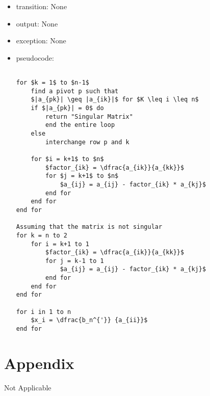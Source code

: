 \documentclass[12pt, titlepage]{article}
\begin{document}
\noindent %
\begin{itemize}
\item transition: None%
\item output: None%
\item exception: None%
\item pseudocode:
\begin{lstlisting}[mathescape=true]

for $k = 1$ to $n-1$
    find a pivot p such that
    $|a_{pk}| \geq |a_{ik}|$ for $K \leq i \leq n$
    if $|a_{pk}| = 0$ do
        return "Singular Matrix"
        end the entire loop
    else 
        interchange row p and k
        
    for $i = k+1$ to $n$
        $factor_{ik} = \dfrac{a_{ik}}{a_{kk}}$
        for $j = k+1$ to $n$
            $a_{ij} = a_{ij} - factor_{ik} * a_{kj}$
        end for
    end for
end for

Assuming that the matrix is not singular
for k = n to 2
    for i = k+1 to 1
        $factor_{ik} = \dfrac{a_{ik}}{a_{kk}}$
        for j = k-1 to 1
            $a_{ij} = a_{ij} - factor_{ik} * a_{kj}$
        end for
    end for
end for

for i in 1 to n
    $x_i = \dfrac{b_n^{'}} {a_{ii}}$
end for

\end{lstlisting}
\end{itemize}


\newpage




\newpage

\section{Appendix} \label{Appendix}
Not Applicable

\end{document}
